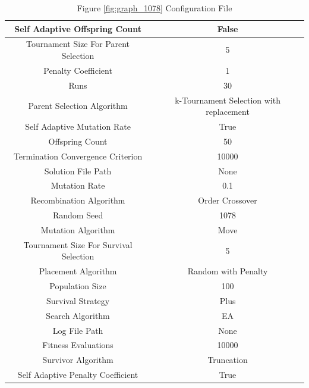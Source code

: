 \documentclass{standalone}
\begin{document}
\begin{table}[!htb]
	\centering
	\caption{Figure \ref{fig:graph_1078} Configuration File}
	\label{tab:graph_1078}
	\begin{tabular}{| c | c |}
		\hline
		Self Adaptive Offspring Count		& False		 \\
		\hline
		Tournament Size For Parent Selection		& 5		 \\
		\hline
		Penalty Coefficient		& 1		 \\
		\hline
		Runs		& 30		 \\
		\hline
		Parent Selection Algorithm		& k-Tournament Selection with replacement		 \\
		\hline
		Self Adaptive Mutation Rate		& True		 \\
		\hline
		Offspring Count		& 50		 \\
		\hline
		Termination Convergence Criterion		& 10000		 \\
		\hline
		Solution File Path		& None		 \\
		\hline
		Mutation Rate		& 0.1		 \\
		\hline
		Recombination Algorithm		& Order Crossover		 \\
		\hline
		Random Seed		& 1078		 \\
		\hline
		Mutation Algorithm		& Move		 \\
		\hline
		Tournament Size For Survival Selection		& 5		 \\
		\hline
		Placement Algorithm		& Random with Penalty		 \\
		\hline
		Population Size		& 100		 \\
		\hline
		Survival Strategy		& Plus		 \\
		\hline
		Search Algorithm		& EA		 \\
		\hline
		Log File Path		& None		 \\
		\hline
		Fitness Evaluations		& 10000		 \\
		\hline
		Survivor Algorithm		& Truncation		 \\
		\hline
		Self Adaptive Penalty Coefficient		& True		 \\
		\hline
	\end{tabular}
\end{table}
\end{document}
